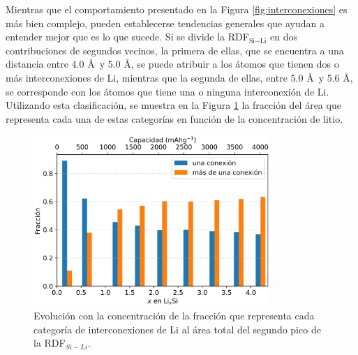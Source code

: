 Mientras que el comportamiento presentado en la Figura \ref{fig:interconexiones}
es más bien complejo, pueden establecerse tendencias generales que ayudan a 
entender mejor que es lo que sucede. Si se divide la RDF$_{\text{Si}-\text{Li}}$ en dos 
contribuciones de segundos vecinos, la primera de ellas, que se encuentra a una
distancia entre 4.0 \AA\ y 5.0 \AA, se puede atribuir a los átomos que tienen dos 
o más interconexiones de Li, mientras que la segunda de ellas, entre 5.0 \AA\ y
5.6 \AA, se corresponde con los átomos que tiene una o ninguna interconexión de 
Li. Utilizando esta clasificación, se muestra en la Figura 
\ref{fig:interconexiones-areas} la fracción del área que representa cada una de
estas categorías en función de la concentración de litio.
\begin{figure}[th]
    \centering
    \includegraphics[width=0.8\textwidth]{Silicio/caracterizacion/resultados/interconexion/interconexiones-areas.png}
    \caption{Evolución con la concentración de la fracción que representa cada
    categoría de interconexiones de Li al área total del segundo pico de la 
    RDF$_{Si-Li}$.}
    \label{fig:interconexiones-areas}
\end{figure}
